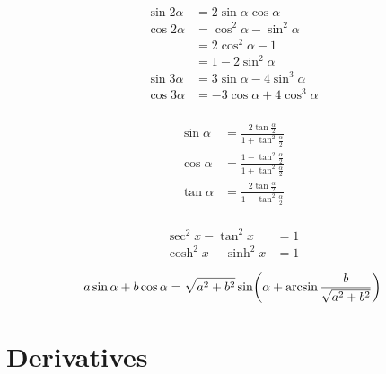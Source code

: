 \begin{multicols}{2}
\begin{equation*}
    \begin{aligned}    
        \sin 2\alpha &= 2 \sin\alpha \cos\alpha \\
        \cos 2\alpha &= \cos^2 \alpha - \sin^2 \alpha \\
        &= 2 \cos^2 \alpha - 1 \\
        &= 1 - 2 \sin^2 \alpha \\
        \sin 3\alpha &= 3 \sin\alpha - 4 \sin^3 \alpha \\
        \cos 3\alpha &= -3 \cos\alpha + 4 \cos^3 \alpha \\
    \end{aligned}
\end{equation*}

\begin{equation*}
    \begin{aligned}       
        \sin \alpha &= \frac{2 \tan \frac{\alpha}{2}}{1 + \tan^2 \frac{\alpha}{2}} \\
        \cos \alpha &= \frac{1 - \tan^2 \frac{\alpha}{2}}{1 + \tan^2 \frac{\alpha}{2}} \\
        \tan \alpha &= \frac{2 \tan \frac{\alpha}{2}}{1 - \tan^2 \frac{\alpha}{2}} \\  
    \end{aligned}
\end{equation*}

\begin{equation*}
    \begin{aligned}
        \sec^2 x - \tan^2 x &= 1 \\
        \cosh^2 x - \sinh^2 x &= 1
    \end{aligned}
\end{equation*}

\begin{equation*}
    a \sin\alpha + b \cos\alpha = \sqrt{a^2 + b^2}\sin\mleft(\alpha + \arcsin\frac{b}{\sqrt{a^2 + b^2}}\mright)
\end{equation*}


\end{multicols}










\section{Derivatives}

